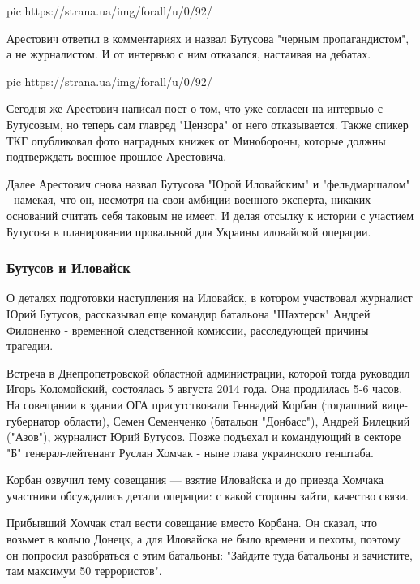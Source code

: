 \ifcmt
pic https://strana.ua/img/forall/u/0/92/%
\fi

Арестович ответил в комментариях и назвал Бутусова "черным
пропагандистом", а не журналистом. И от интервью с ним отказался,
настаивая на дебатах.

\ifcmt
pic https://strana.ua/img/forall/u/0/92/%
\fi

Сегодня же Арестович написал пост о том, что уже согласен на интервью с
Бутусовым, но теперь сам главред "Цензора" от него отказывается. Также
спикер ТКГ опубликовал фото наградных книжек от Минобороны, которые должны
подтверждать военное прошлое Арестовича. 

Далее Арестович снова назвал Бутусова "Юрой Иловайским" и "фельдмаршалом"
- намекая, что он, несмотря на свои амбиции военного эксперта, никаких
оснований считать себя таковым не имеет. И делая отсылку к истории с
участием Бутусова в планировании провальной для Украины иловайской
операции.

\subsubsection{Бутусов и Иловайск}

О деталях подготовки наступления на Иловайск, в котором участвовал журналист
Юрий Бутусов, рассказывал еще командир батальона "Шахтерск" Андрей
Филоненко
- временной следственной комиссии, расследующей причины трагедии.

Встреча в Днепропетровской областной администрации, которой тогда
руководил Игорь Коломойский, состоялась 5 августа 2014 года. Она
продлилась 5-6 часов. На совещании в здании ОГА присутствовали Геннадий
Корбан (тогдашний вице-губернатор области), Семен Семенченко (батальон
"Донбасс"), Андрей Билецкий ("Азов"), журналист Юрий Бутусов. Позже
подъехал и командующий в секторе "Б" генерал-лейтенант Руслан Хомчак -
ныне глава украинского генштаба.

Корбан озвучил тему совещания — взятие Иловайска и до приезда Хомчака
участники обсуждались детали операции: с какой стороны зайти, качество
связи.

Прибывший Хомчак стал вести совещание вместо Корбана. Он сказал, что
возьмет в кольцо Донецк, а для Иловайска не было времени и пехоты, поэтому
он попросил разобраться с этим батальоны: "Зайдите туда батальоны и
зачистите, там максимум 50 террористов".

